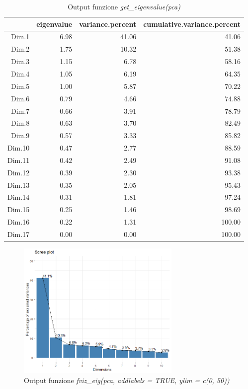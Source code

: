 \documentclass[letterpaper,11pt]{article}
\begin{document}
\begin{table}[h!t]
\centering
\begin{tabular}{rrrr}
  \hline
 & eigenvalue & variance.percent & cumulative.variance.percent \\ 
  \hline
Dim.1 & 6.98 & 41.06 & 41.06 \\ 
  Dim.2 & 1.75 & 10.32 & 51.38 \\ 
  Dim.3 & 1.15 & 6.78 & 58.16 \\ 
  Dim.4 & 1.05 & 6.19 & 64.35 \\ 
  Dim.5 & 1.00 & 5.87 & 70.22 \\ 
  Dim.6 & 0.79 & 4.66 & 74.88 \\ 
  Dim.7 & 0.66 & 3.91 & 78.79 \\ 
  Dim.8 & 0.63 & 3.70 & 82.49 \\ 
  Dim.9 & 0.57 & 3.33 & 85.82 \\ 
  Dim.10 & 0.47 & 2.77 & 88.59 \\ 
  Dim.11 & 0.42 & 2.49 & 91.08 \\ 
  Dim.12 & 0.39 & 2.30 & 93.38 \\ 
  Dim.13 & 0.35 & 2.05 & 95.43 \\ 
  Dim.14 & 0.31 & 1.81 & 97.24 \\ 
  Dim.15 & 0.25 & 1.46 & 98.69 \\ 
  Dim.16 & 0.22 & 1.31 & 100.00 \\ 
  Dim.17 & 0.00 & 0.00 & 100.00 \\ 
   \hline
\end{tabular}
\caption{Output funzione \textit{get\_eigenvalue(pca)}}
\label{fig:get_eigenvalue(pca)}
\end{table}
\begin{figure}[H]
    \centering
    \includegraphics[width=0.7\textwidth]{Img/PCA/Rplot.png}
    \caption{Output funzione \textit{fviz\_eig(pca, addlabels = TRUE, ylim = c(0, 50))}}
    \label{fig:fviz_eig(pca, addlabels = TRUE, ylim = c(0, 50))}
\end{figure}
\end{document}
